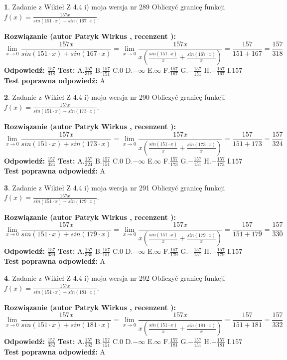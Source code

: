 \documentclass[12pt, a4paper]{article}
\theoremstyle{definition} %
\newtheorem{zad}{}
\newcommand{\zadStart}[1]{\begin{zad}#1\newline}
\newcommand{\zadStop}{\end{zad}}
\newcommand{\rozwStart}[2]{\noindent \textbf{Rozwiązanie (autor #1 , recenzent #2): }\newline}
\newcommand{\rozwStop}{\newline}
\newcommand{\odpStart}{\noindent \textbf{Odpowiedź:}\newline}
\newcommand{\odpStop}{\newline}
\newcommand{\testStart}{\noindent \textbf{Test:}\newline}
\newcommand{\testStop}{\newline}
\newcommand{\kluczStart}{\noindent \textbf{Test poprawna odpowiedź:}\newline}
\newcommand{\kluczStop}{\newline}
\begin{document}
\zadStart{Zadanie z Wikieł Z 4.4 i) moja wersja nr 289}
Obliczyć granicę funkcji $f(x)=\frac{157x}{sin(151\cdot x) +sin(167\cdot x)}$.
\zadStop
\rozwStart{Patryk Wirkus}{}
$$\lim\limits_{x\to 0}\frac{157x}{sin(151\cdot x) +sin(167\cdot x)}=\lim\limits_{x\to 0}\frac{157x}{x(\frac{sin(151\cdot x)}{x}+\frac{sin(167\cdot x)}{x})}=\frac{157}{151+167} = \frac{157}{318}$$
\rozwStop
\odpStart
$\frac{157}{318}$
\odpStop
\testStart
A.$\frac{157}{318}$
B.$\frac{157}{151}$
C.$0$
D.$-\infty$
E.$\infty$
F.$\frac{157}{167}$
G.$-\frac{157}{151}$
H.$-\frac{157}{167}$
I.$157$
\testStop
\kluczStart
A
\kluczStop



\zadStart{Zadanie z Wikieł Z 4.4 i) moja wersja nr 290}
Obliczyć granicę funkcji $f(x)=\frac{157x}{sin(151\cdot x) +sin(173\cdot x)}$.
\zadStop
\rozwStart{Patryk Wirkus}{}
$$\lim\limits_{x\to 0}\frac{157x}{sin(151\cdot x) +sin(173\cdot x)}=\lim\limits_{x\to 0}\frac{157x}{x(\frac{sin(151\cdot x)}{x}+\frac{sin(173\cdot x)}{x})}=\frac{157}{151+173} = \frac{157}{324}$$
\rozwStop
\odpStart
$\frac{157}{324}$
\odpStop
\testStart
A.$\frac{157}{324}$
B.$\frac{157}{151}$
C.$0$
D.$-\infty$
E.$\infty$
F.$\frac{157}{173}$
G.$-\frac{157}{151}$
H.$-\frac{157}{173}$
I.$157$
\testStop
\kluczStart
A
\kluczStop



\zadStart{Zadanie z Wikieł Z 4.4 i) moja wersja nr 291}
Obliczyć granicę funkcji $f(x)=\frac{157x}{sin(151\cdot x) +sin(179\cdot x)}$.
\zadStop
\rozwStart{Patryk Wirkus}{}
$$\lim\limits_{x\to 0}\frac{157x}{sin(151\cdot x) +sin(179\cdot x)}=\lim\limits_{x\to 0}\frac{157x}{x(\frac{sin(151\cdot x)}{x}+\frac{sin(179\cdot x)}{x})}=\frac{157}{151+179} = \frac{157}{330}$$
\rozwStop
\odpStart
$\frac{157}{330}$
\odpStop
\testStart
A.$\frac{157}{330}$
B.$\frac{157}{151}$
C.$0$
D.$-\infty$
E.$\infty$
F.$\frac{157}{179}$
G.$-\frac{157}{151}$
H.$-\frac{157}{179}$
I.$157$
\testStop
\kluczStart
A
\kluczStop



\zadStart{Zadanie z Wikieł Z 4.4 i) moja wersja nr 292}
Obliczyć granicę funkcji $f(x)=\frac{157x}{sin(151\cdot x) +sin(181\cdot x)}$.
\zadStop
\rozwStart{Patryk Wirkus}{}
$$\lim\limits_{x\to 0}\frac{157x}{sin(151\cdot x) +sin(181\cdot x)}=\lim\limits_{x\to 0}\frac{157x}{x(\frac{sin(151\cdot x)}{x}+\frac{sin(181\cdot x)}{x})}=\frac{157}{151+181} = \frac{157}{332}$$
\rozwStop
\odpStart
$\frac{157}{332}$
\odpStop
\testStart
A.$\frac{157}{332}$
B.$\frac{157}{151}$
C.$0$
D.$-\infty$
E.$\infty$
F.$\frac{157}{181}$
G.$-\frac{157}{151}$
H.$-\frac{157}{181}$
I.$157$
\testStop
\kluczStart
A
\kluczStop
\end{document}
